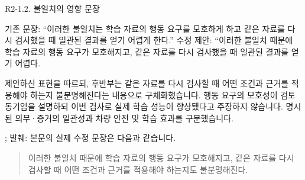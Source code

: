 \begin{reviewitem}{R2-1.2. 불일치의 영향 문장}

\begin{reviewercomment}

기존 문장: ``이러한 불일치는 학습 자료의 행동 요구를 모호하게 하고 같은 자료를 다시 검사했을 때 일관된 결과를 얻기 어렵게 한다.'' 수정 제안: ``이러한 불일치 때문에 학습 자료의 행동 요구가 모호해지고, 같은 자료를 다시 검사했을 때 일관된 결과를 얻기 어렵다.

\end{reviewercomment}

\begin{authorresponse}

제안하신 표현을 따르되, 후반부는 같은 자료를 다시 검사할 때 어떤 조건과 근거를 적용해야 하는지 불분명해진다는 내용으로 구체화했습니다. 행동 요구의 모호성이 검토 동기임을 설명하되 이번 검사로 실제 학습 성능이 향상됐다고 주장하지 않습니다. 명시된 의무·증거의 일관성과 차량 안전 및 학습 효과를 구분했습니다.

\end{authorresponse}

\begin{manuscriptrevision}{; 발췌: }
본문의 실제 수정 문장은 다음과 같습니다.

\begin{quote}
이러한 불일치 때문에 학습 자료의 행동 요구가 모호해지고, 같은 자료를 다시 검사할 때 어떤 조건과 근거를 적용해야 하는지도 불분명해진다.
\end{quote}
\end{manuscriptrevision}

\end{reviewitem}

\clearpage

